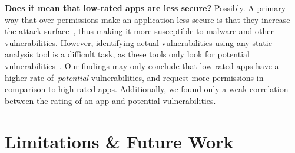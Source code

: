 \documentclass{sig-alternate-05-2015}
\newcommand{\todo}[1]{\textcolor{cyan}{\textbf{[#1]}}}
\begin{document}


\textbf{Does it mean that low-rated apps are less secure?} Possibly.
A primary way that over-permissions make an application less secure is that they increase the attack surface~\cite{5482589, Felt:2011:APD:2046707.2046779}, thus making it more susceptible to malware and other vulnerabilities. However, identifying actual vulnerabilities using any static analysis tool is a difficult task, as these tools only look for potential vulnerabilities~\cite{chess2004static}. Our findings may only conclude that low-rated apps have a higher rate of~\emph{potential} vulnerabilities, and request more permissions in comparison to high-rated apps. Additionally, we found only a weak correlation between the rating of an app and potential vulnerabilities.
















\section{Limitations \& Future Work}
\label{sec:limitations}
\end{document}
